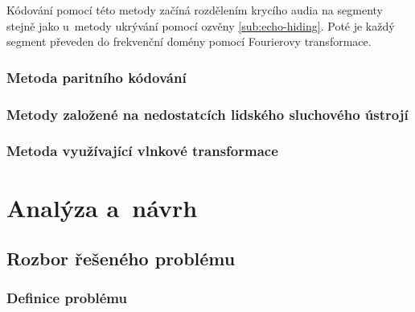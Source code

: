 Kódování pomocí této metody začíná rozdělením krycího audia na segmenty stejně
jako u~metody ukrývání pomocí ozvěny \ref{sub:echo-hiding}. Poté je každý
segment převeden do frekvenční domény pomocí Fourierovy transformace.

\subsection*{Metoda paritního kódování}
\label{sub:parity-coding}


\blindtext

\blindtext

\blindtext

\subsection*{Metody založené na nedostatcích lidského sluchového ústrojí}
\label{sub:has}


\blindtext

\blindtext

\blindtext

\subsection*{Metoda využívající vlnkové transformace}
\label{sub:wavelet-transform}


\blindtext


\chapter{Analýza a~návrh}
\label{cha:library-design}


\blindtext

\section{Rozbor řešeného problému}
\label{sec:problem-analysis}


\blindtext

\subsection*{Definice problému}
\label{sub:problem-definition}

